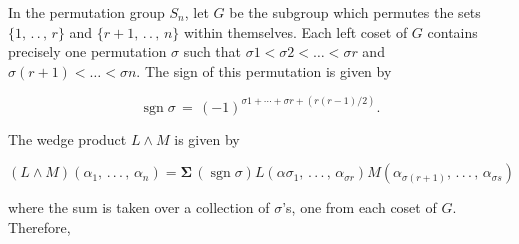 In the permutation group \(S_{n}\), let \(G\) be the subgroup which permutes the sets \(\{1,\,.\,.\,,\,r\}\) and \(\{r+1,\,.\,.\,,\,n\}\) within themselves. Each left coset of \(G\) contains precisely one permutation \(\sigma\) such that \(\sigma 1<\sigma 2<\ldots<\sigma r\) and \(\sigma(r+1)<\ldots<\sigma n\). The sign of this permutation is given by

\[\operatorname{sgn}\sigma\,=\,(-1)^{\sigma 1+\cdots+\sigma r+(r(r-1)/2)}.\]

The wedge product \(L\wedge M\) is given by

\[(L\wedge M)(\alpha_{1},\,.\,.\,.\,,\,\alpha_{n})=\boldsymbol{\Sigma}\,( \operatorname{sgn}\sigma)L(\alpha\sigma_{1},\,.\,.\,.\,,\,\alpha_{\sigma r})M (\alpha_{\sigma(r+1)},\,.\,.\,.\,,\,\alpha_{\sigma s})\]

where the sum is taken over a collection of \(\sigma\)'s, one from each coset of \(G\). Therefore, 
